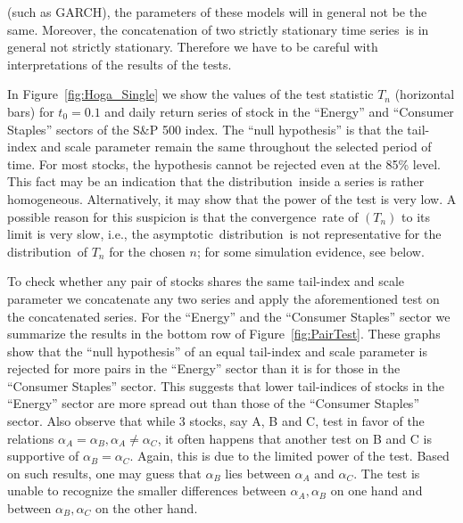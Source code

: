 \documentclass[11pt,a4]{amsart}
\newcommand{\asy}{asymptotic}
\newcommand{\ts}{time series}
\newcommand{\con}{convergence}
\newcommand{\ds}{distribution}
\newcommand{\1}{{\mathbf 1}}
\begin{document}
(such as GARCH), the parameters of these models will in general not be the same. Moreover, the concatenation
of two strictly stationary \ts\ is in general not strictly stationary. Therefore we have to be careful
with interpretations of the results of the tests.
\par 
In Figure~\ref{fig:Hoga_Single} we show the values of the test statistic $T_n$ (horizontal bars)
for $t_0=0.1$ and daily return series of stock in the ``Energy'' and ``Consumer Staples'' sectors of the S\&P
500 index. The ``null hypothesis'' is that the tail-index and scale parameter remain the
same throughout the selected period of time. For most stocks, the hypothesis cannot be rejected even at the 85\% level.
This fact may be an indication that the \ds\ inside a series is rather homogeneous.
Alternatively, it may show that the power of the test is very low. A possible reason for this suspicion is that the \con\ rate
of $(T_n)$ to its limit is very slow, i.e., the \asy\ \ds\ is not representative for the \ds\ of $T_n$ for the chosen $n$; for some
simulation evidence, see below.
\par
To check whether any pair of stocks shares the same tail-index and scale parameter we concatenate
any two series and apply the aforementioned test on the concatenated series. For the ``Energy'' and the
``Consumer Staples'' sector we summarize the results in the bottom row of Figure~\ref{fig:PairTest}.
These graphs show that the ``null
hypothesis'' of an equal tail-index and scale parameter is rejected for more pairs in the
``Energy'' sector than it is for those in the ``Consumer Staples''
sector. This suggests that lower tail-indices of stocks in the
``Energy'' sector are more spread out than those of the ``Consumer
Staples'' sector. Also observe that while 3 stocks, say A, B and C, test in favor of
the relations $\alpha_A = \alpha_B, \alpha_A \neq \alpha_C$, it often
happens that another test on B and C is supportive of $\alpha_B = \alpha_C$. Again,
this is due to the limited power of the test. Based
on such results, one may guess that $\alpha_B$ lies between $\alpha_A$ and
$\alpha_C$. The test is unable to recognize the smaller differences
between $\alpha_A, \alpha_B$ on one hand and between $\alpha_B, \alpha_C$ on the other hand.
\end{document}
